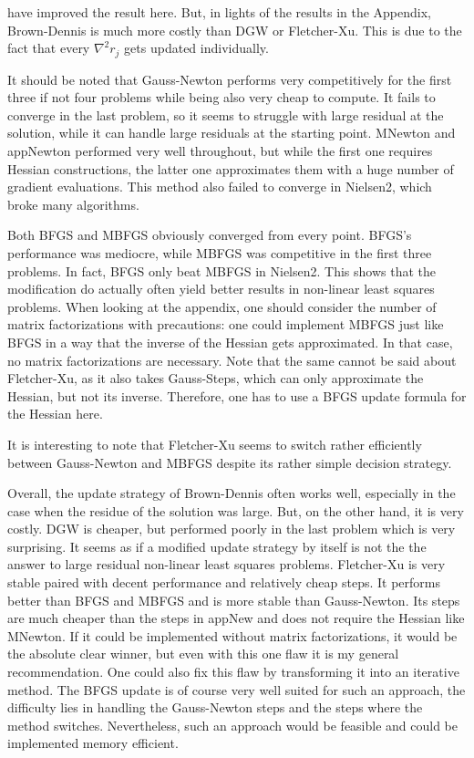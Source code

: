 \documentclass{article}
\theoremstyle{plain}%
\theoremstyle{definition}
\begin{document}
have improved the result here. But, in lights of the results in the Appendix, Brown-Dennis is much more costly than DGW or Fletcher-Xu. This is due to
the fact that every $\nabla^2 r_j$ gets updated individually. \par
It should be noted that Gauss-Newton performs very competitively for the first three if not four problems while being also very cheap to compute.
It fails to converge in the last problem, so it seems to struggle with large residual at the solution, while it can handle large residuals at the starting point.
MNewton and appNewton performed very well throughout, but while the first one requires Hessian constructions, the latter one approximates them with a huge number of
gradient evaluations. This method also failed to converge in Nielsen2, which broke many algorithms.  \par
Both BFGS and MBFGS obviously converged from every point. BFGS's performance was mediocre, while MBFGS was competitive in the first three problems.
In fact, BFGS only beat MBFGS in Nielsen2. This shows that the modification do actually often yield better results in non-linear least squares problems.
When looking at the appendix, one should consider the number of matrix factorizations with precautions: one could implement MBFGS just like BFGS
in a way that the inverse of the Hessian gets approximated. In that case, no matrix factorizations are necessary. Note that the same cannot be said about
Fletcher-Xu, as it also takes Gauss-Steps, which can only approximate the Hessian, but not its inverse. Therefore, one has to use a BFGS update formula
for the Hessian here.\par
It is interesting to note that Fletcher-Xu seems to switch rather efficiently between Gauss-Newton and MBFGS despite its rather simple decision strategy.\par
Overall, the update strategy of Brown-Dennis often works well, especially in the case when the residue of the solution was large. But, on the other hand, it is very costly.
DGW is cheaper, but performed poorly in  the last problem which is very surprising. It seems as if a modified update strategy by itself is not the the answer to
large residual non-linear least squares problems. Fletcher-Xu is very stable paired with decent performance and relatively cheap steps. It performs
better than BFGS and MBFGS and is more stable than Gauss-Newton. Its steps are much cheaper than the steps in appNew and does not require the Hessian like MNewton.
If it could be implemented without matrix factorizations, it would be the absolute clear winner, but even with this one flaw it is my general recommendation.
One could also fix this flaw by transforming it into an iterative method. The BFGS update is of course very well suited for such an approach,
the difficulty lies in handling the Gauss-Newton steps and the steps where the method switches. Nevertheless, such an approach would be feasible and could be implemented memory efficient.
\end{document}
